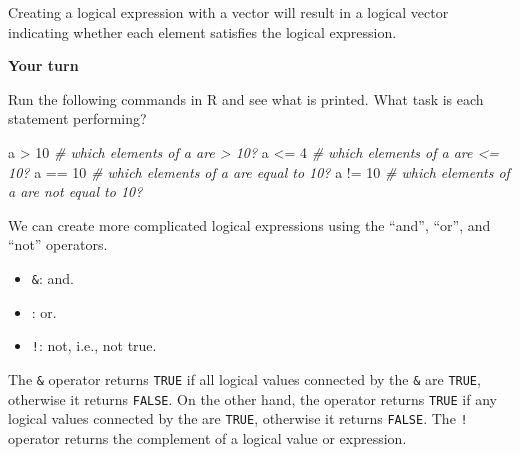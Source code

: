 \documentclass[
]{book}
\newenvironment{Shaded}{\begin{snugshade}}{\end{snugshade}}
\newcommand{\CommentTok}[1]{\textcolor[rgb]{0.56,0.35,0.01}{\textit{#1}}}
\newcommand{\DecValTok}[1]{\textcolor[rgb]{0.00,0.00,0.81}{#1}}
\newcommand{\NormalTok}[1]{#1}
\newcommand{\SpecialCharTok}[1]{\textcolor[rgb]{0.00,0.00,0.00}{#1}}
\providecommand{\tightlist}{%
  \setlength{\itemsep}{0pt}\setlength{\parskip}{0pt}}
\theoremstyle{definition}
\theoremstyle{definition}
\theoremstyle{definition}
\theoremstyle{definition}
\theoremstyle{remark}
\begin{document}
Creating a logical expression with a vector will result in a logical vector indicating whether each element satisfies the logical expression.

\begin{yourturn}

\textbf{Your turn}

Run the following commands in R and see what is printed. What task is each statement performing?

\begin{Shaded}
\begin{Highlighting}[]
\NormalTok{a }\SpecialCharTok{\textgreater{}} \DecValTok{10}  \CommentTok{\# which elements of a are \textgreater{} 10?}
\NormalTok{a }\SpecialCharTok{\textless{}=} \DecValTok{4}  \CommentTok{\# which elements of a are \textless{}= 10?}
\NormalTok{a }\SpecialCharTok{==} \DecValTok{10} \CommentTok{\# which elements of a are equal to 10?}
\NormalTok{a }\SpecialCharTok{!=} \DecValTok{10} \CommentTok{\# which elements of a are not equal to 10?}
\end{Highlighting}
\end{Shaded}

\end{yourturn}

We can create more complicated logical expressions using the ``and'', ``or'', and ``not'' operators.

\begin{itemize}
\tightlist
\item
  \texttt{\&}: and.
\item
  \texttt{\textbar{}}: or.
\item
  \texttt{!}: not, i.e., not true.
\end{itemize}

The \texttt{\&} operator returns \texttt{TRUE} if all logical values connected by the \texttt{\&} are \texttt{TRUE}, otherwise it returns \texttt{FALSE}. On the other hand, the \texttt{\textbar{}} operator returns \texttt{TRUE} if any logical values connected by the \texttt{\textbar{}} are \texttt{TRUE}, otherwise it returns \texttt{FALSE}. The \texttt{!} operator returns the complement of a logical value or expression.
\end{document}
